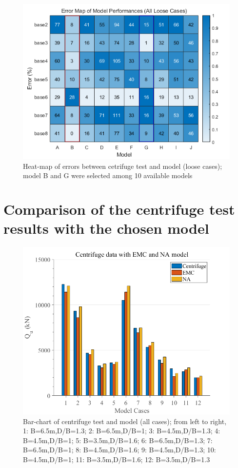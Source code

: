 \documentclass[a4paper, nobind]{templates/ociamthesis}
\begin{document}
\begin{figure}[H]
\includegraphics[width=1\linewidth]{myfigureeeeee/errormap_emc2} \caption{Heat-map of errors between cetrifuge test and model (loose cases); model B and G were selected among 10 available models}\label{fig:unnamed-chunk-45}
\end{figure}

\hypertarget{comparison-of-the-centrifuge-test-results-with-the-chosen-model}{%
\section{Comparison of the centrifuge test results with the chosen model}\label{comparison-of-the-centrifuge-test-results-with-the-chosen-model}}

\begin{figure}[H]
\includegraphics[width=1\linewidth]{myfigureeeeee/barchart1} \caption{Bar-chart of centrifuge test and model (all cases); from left to right, 1: B=6.5m,D/B=1.3; 2: B=6.5m,D/B=1; 3: B=4.5m,D/B=1.3; 4: B=4.5m,D/B=1; 5: B=3.5m,D/B=1.6; 6: B=6.5m,D/B=1.3; 7: B=6.5m,D/B=1; 8: B=4.5m,D/B=1.6; 9: B=4.5m,D/B=1.3; 10: B=4.5m,D/B=1; 11: B=3.5m,D/B=1.6; 12: B=3.5m,D/B=1.3}\label{fig:unnamed-chunk-46}
\end{figure}
\end{document}
